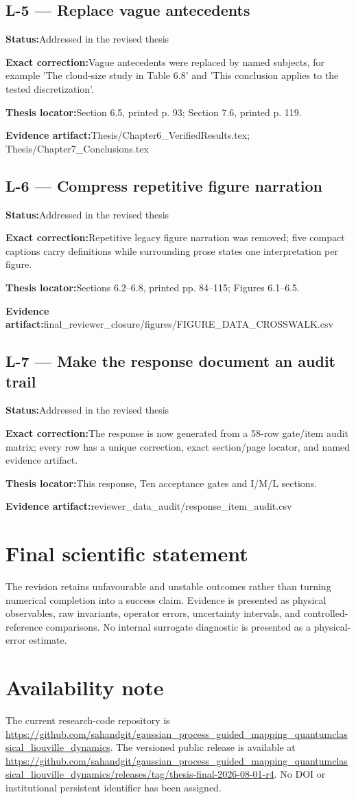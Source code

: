 \documentclass[11pt]{article}
\newcommand{\field}[2]{\textbf{#1}\quad #2\par}
\begin{document}
\subsection*{L-5 --- Replace vague antecedents}
\field{Status:}{Addressed in the revised thesis}
\field{Exact correction:}{Vague antecedents were replaced by named subjects, for example 'The cloud-size study in Table 6.8' and 'This conclusion applies to the tested discretization'.}
\field{Thesis locator:}{Section 6.5, printed p. 93; Section 7.6, printed p. 119.}
\field{Evidence artifact:}{Thesis/Chapter6\_VerifiedResults.tex; Thesis/Chapter7\_Conclusions.tex}
\subsection*{L-6 --- Compress repetitive figure narration}
\field{Status:}{Addressed in the revised thesis}
\field{Exact correction:}{Repetitive legacy figure narration was removed; five compact captions carry definitions while surrounding prose states one interpretation per figure.}
\field{Thesis locator:}{Sections 6.2--6.8, printed pp. 84--115; Figures 6.1--6.5.}
\field{Evidence artifact:}{final\_reviewer\_closure/figures/FIGURE\_DATA\_CROSSWALK.csv}
\subsection*{L-7 --- Make the response document an audit trail}
\field{Status:}{Addressed in the revised thesis}
\field{Exact correction:}{The response is now generated from a 58-row gate/item audit matrix; every row has a unique correction, exact section/page locator, and named evidence artifact.}
\field{Thesis locator:}{This response, Ten acceptance gates and I/M/L sections.}
\field{Evidence artifact:}{reviewer\_data\_audit/response\_item\_audit.csv}
\section*{Final scientific statement}
The revision retains unfavourable and unstable outcomes rather than turning numerical completion into a success claim. Evidence is presented as physical observables, raw invariants, operator errors, uncertainty intervals, and controlled-reference comparisons. No internal surrogate diagnostic is presented as a physical-error estimate.
\section*{Availability note}
The current research-code repository is \url{https://github.com/sahandgit/gaussian_process_guided_mapping_quantumclassical_liouville_dynamics}. The versioned public release is available at \url{https://github.com/sahandgit/gaussian_process_guided_mapping_quantumclassical_liouville_dynamics/releases/tag/thesis-final-2026-08-01-r4}. No DOI or institutional persistent identifier has been assigned.
\end{document}
